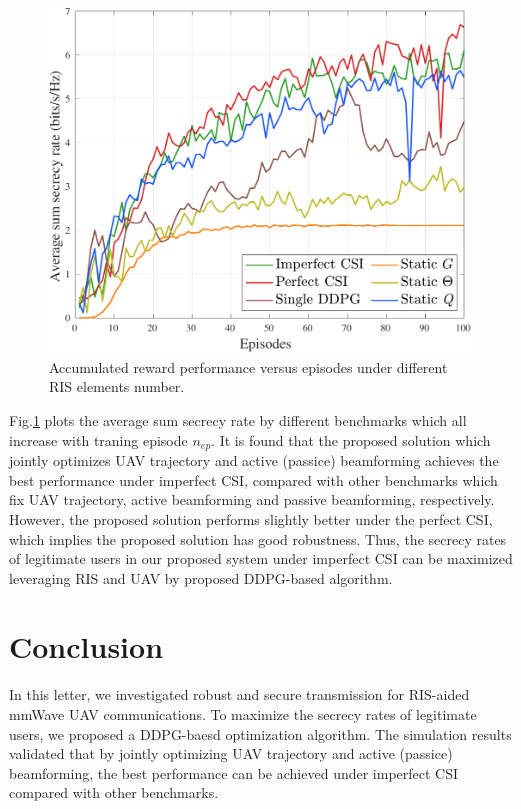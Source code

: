 \documentclass[journal]{IEEEtran}
\begin{document}
\begin{figure}
  \centering
	\includegraphics[width=1.0\linewidth]{./plot/compare/compare.pdf}%
	\caption{Accumulated reward performance versus episodes under different RIS elements number.}  %
  \label{compare}
\end{figure}
Fig.\ref{compare} plots the average sum secrecy rate by different benchmarks which all increase with traning episode $n_{ep}$. It is found that the proposed solution which jointly optimizes UAV trajectory and active (passice) beamforming achieves the best performance under imperfect CSI, compared with other benchmarks which fix UAV trajectory, active beamforming and passive beamforming, respectively. However, the proposed solution performs slightly better under the perfect CSI, which implies the proposed solution has good robustness. Thus, the secrecy rates of legitimate users in our proposed system under imperfect CSI can be maximized leveraging RIS and UAV by proposed DDPG-based algorithm.

\section{Conclusion}
In this letter, we investigated robust and secure transmission for RIS-aided mmWave UAV communications. To maximize the secrecy rates of legitimate users, we proposed a DDPG-baesd optimization algorithm. The simulation results validated that by jointly optimizing UAV trajectory and active (passice) beamforming, the best performance can be achieved under imperfect CSI compared with other benchmarks.
\end{document}
